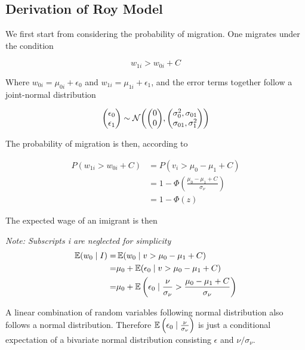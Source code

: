 \subsection{Derivation of Roy Model}

We first start from considering the probability of migration. 
One migrates under the condition

\begin{equation}
    w_{1i} > w_{0i} + C
\end{equation}

Where $w_{0i} = \mu_{0i} + \epsilon_0$ and $w_{1i} = \mu_{1i} + \epsilon_1$, 
and the error terms together follow a joint-normal distribution

\begin{equation}
    \label{eq:def_w}
    \mqty(\epsilon_0 \\ \epsilon_1) 
    \sim
    \mathcal{N} \qty(
        \mqty(0 \\ 0),
        \mqty(\sigma_0^2, \sigma_{01} \\
              \sigma_{01}, \sigma_1^2)
    )
\end{equation}

The probability of migration is then, according to 

\begin{align}
    P(w_{1i} > w_{0i} + C) &= P(v_i > \mu_0 - \mu_1 + C) \nonumber \\
    &=1 - \Phi(\frac{\mu_0 - \mu_1 + C}{\sigma_\nu}) \nonumber \\
    &=1 - \Phi(z) \nonumber
\end{align}

The expected wage of an imigrant is then

\newcommand{\given}{\mid}

\emph{Note: Subscripts i are neglected for simplicity}
\begin{align*}
    \E(w_{0} \given I) =& \E(w_{0} \given v > \mu_0 - \mu_1 + C)  \\
    =& \mu_0 + \E(\epsilon_0 \given  v > \mu_0 - \mu_1 + C )  \\
    =& \mu_0 + \E \left(
            \epsilon_0 \given \frac{\nu}{\sigma_\nu} > \frac{\mu_0 - \mu_1 + C}{\sigma_\nu}
            \right)
\end{align*}

A linear combination of random variables following normal distribution
also follows a normal distribution. Therefore $\E\left(\epsilon_0 \given \frac{\nu}{\sigma_\nu}\right)$
is just a conditional expectation of a bivariate normal distribution
consisting $\epsilon$ and $\nu/\sigma_\nu$.

